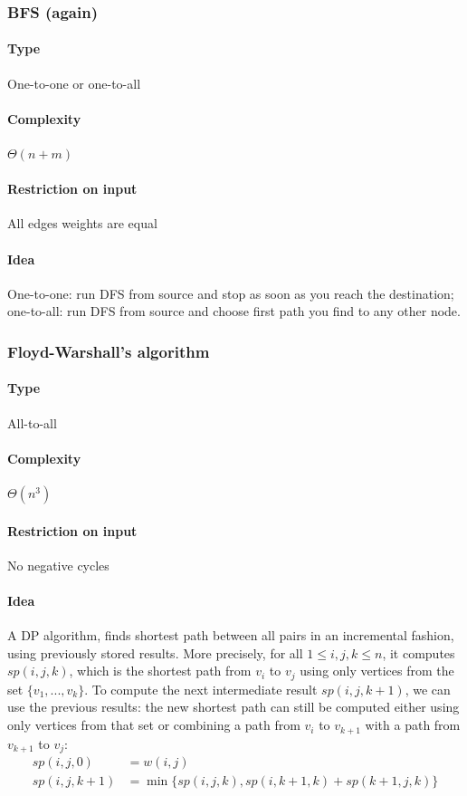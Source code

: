 \documentclass[a4paper]{article}
\begin{document}
\subsubsection{BFS (again)}

\paragraph{Type} One-to-one or one-to-all

\paragraph{Complexity} $\Theta\left(n+m\right)$

\paragraph{Restriction on input} All edges weights are equal

\paragraph{Idea} One-to-one: run DFS from source and stop as soon as you reach the destination; one-to-all: run DFS from source and choose first path you find to any other node.

\subsubsection{Floyd-Warshall's algorithm}

\paragraph{Type} All-to-all

\paragraph{Complexity} $\Theta\left(n^3\right)$

\paragraph{Restriction on input} No negative cycles

\paragraph{Idea} A DP algorithm, finds shortest path between all pairs in an incremental fashion, using previously stored results. More precisely, for all $1 \leq i,j,k \leq n$, it computes $sp(i,j,k)$, which is the shortest path from $v_i$ to $v_j$ using only vertices from the set $\{v_1, ..., v_k\}$. To compute the next intermediate result $sp(i,j,k+1)$, we can use the previous results: the new shortest path can still be computed either using only vertices from that set or combining a path from $v_i$ to $v_{k+1}$ with a path from $v_{k+1}$ to $v_j$:
\begin{align*}
  sp(i,j,0) &= w(i,j) \\
  sp(i,j,k+1) &= \min\{sp(i,j,k), sp(i,k+1,k)+sp(k+1,j,k)\}
\end{align*}
\end{document}
